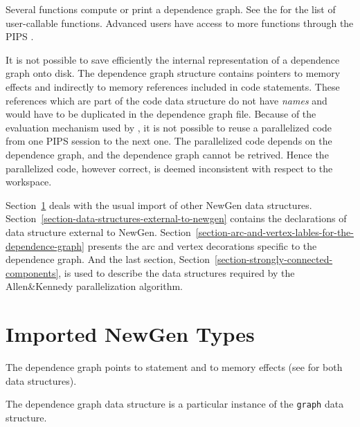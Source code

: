 Several functions compute or print a dependence graph. See the
 for the list of
user-callable functions. Advanced users have access to more functions
through the PIPS
.

It is not possible to save efficiently
the internal representation of a dependence graph onto disk. The
dependence graph structure contains pointers to memory effects and
indirectly to memory references included in code statements. These
references which are part of the code data structure do not have {\em
  names} and would have to be duplicated in the dependence graph
file. Because of the evaluation mechanism used by , it is not possible to
reuse a parallelized code from one PIPS session to the next one. The
parallelized code depends on the dependence graph, and the dependence
graph cannot be retrived. Hence the parallelized code, however correct, is
deemed inconsistent with respect to the workspace.

Section~\ref{section-imported-newgen-types} deals with the usual import of
other NewGen data structures.
Section~\ref{section-data-structures-external-to-newgen} contains the
declarations of data structure external to NewGen.
Section~\ref{section-arc-and-vertex-lables-for-the-dependence-graph}
presents the arc and vertex decorations specific to the dependence graph.
And the last section, Section~\ref{section-strongly-connected-components},
is used to describe the data structures required by the Allen\&Kennedy
parallelization algorithm.

\section{Imported NewGen Types}
\label{section-imported-newgen-types}

The dependence graph points to statement and to memory effects (see
 for
both data structures).

\begin{comment}
\domain{Import statement from "ri.newgen"}
{}
\end{comment}

{}

The dependence graph data structure is  a particular instance of the
\verb/graph/ data structure.

